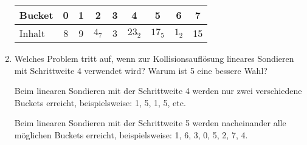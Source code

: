 \documentclass{lehramt-informatik-aufgabe}
\begin{document}
\begin{enumerate}
\begin{antwort}
\begin{center}
\begin{tabular}{l|cccccccc}
Bucket    & 0  & 1 & 2     & 3 & 4      & 5      & 6     & 7 \\\hline
Inhalt    & 8  & 9 & $4_7$ & 3 & $23_2$ & $17_5$ & $1_2$ & 15 \\
\end{tabular}
\end{center}
\end{antwort}


\item Welches Problem tritt auf, wenn zur Kollisionsauflösung lineares
Sondieren mit Schrittweite 4 verwendet wird? Warum ist 5 eine bessere
Wahl?

\begin{antwort}
Beim linearen Sondieren mit der Schrittweite 4 werden nur zwei
verschiedene Buckets erreicht, beispielsweise: 1, 5, 1, 5, etc.

Beim linearen Sondieren mit der Schrittweite 5 werden nacheinander alle
möglichen Buckets erreicht, beispielsweise: 1, 6, 3, 0, 5, 2, 7, 4.
\end{antwort}

\end{enumerate}
\end{document}
